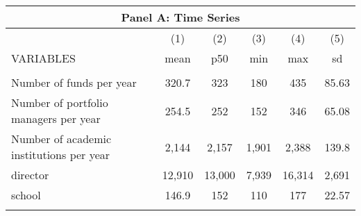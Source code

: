 \documentclass[]{article}
\begin{document}
\begin{tabular}{lccccc}
\multicolumn{6}{c}{Panel A: Time Series} \\ \hline
 & (1) & (2) & (3) & (4) & (5) \\
VARIABLES & mean & p50 & min & max & sd \\ \hline
 &  &  &  &  &  \\
Number of funds per year & 320.7 & 323 & 180 & 435 & 85.63 \\
Number of portfolio managers per year & 254.5 & 252 & 152 & 346 & 65.08 \\
Number of academic institutions per year & 2,144 & 2,157 & 1,901 & 2,388 & 139.8 \\
director & 12,910 & 13,000 & 7,939 & 16,314 & 2,691 \\
school & 146.9 & 152 & 110 & 177 & 22.57 \\
 &  &  &  &  &  \\ \hline
\end{tabular}
\end{document}
